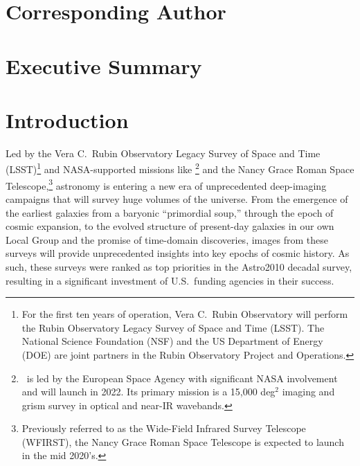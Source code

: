 \documentclass[11pt,a4paper,twoside,onecolumn,openany,final,oldfontcommands]{memoir}
\begin{document}


\frontmatter

\thispagestyle{empty}  %

\clearpage
\setupmaintoc
\tableofcontents 

\clearpage
\listoffigures

\clearpage
\listoftables

\chapter{Corresponding Author}
%



\chapter{Executive Summary}




\mainmatter

\chapter{Introduction}

Led by the Vera C.~Rubin Observatory Legacy Survey of Space and Time (LSST)\footnote{For the first ten years of operation, Vera C.~Rubin Observatory will perform the Rubin Observatory Legacy Survey of Space and Time (LSST). The National Science Foundation (NSF) and the US Department of Energy (DOE) are joint partners in the Rubin Observatory Project and Operations.} and NASA-supported missions like \euclid\footnote{\euclid\ is led by the European Space Agency with significant NASA involvement and will launch in 2022. Its primary mission is a 15,000 deg$^2$ imaging and grism survey in optical and near-IR wavebands.} and the Nancy Grace Roman Space Telescope,\footnote{Previously referred to as the Wide-Field Infrared Survey Telescope (WFIRST), the Nancy Grace Roman Space Telescope is expected to launch in the mid 2020's.} astronomy is entering a new era of unprecedented deep-imaging campaigns that will survey huge volumes of the universe. From the emergence of the earliest galaxies from a baryonic ``primordial soup,'' through the epoch of cosmic expansion, to the evolved structure of present-day galaxies in our own Local Group and the promise of time-domain discoveries, images from these surveys will provide unprecedented insights into key epochs of cosmic history. As such, these surveys were ranked as top priorities in the Astro2010 decadal survey, resulting in a significant investment of U.S.\ funding agencies in their success.
\end{document}
